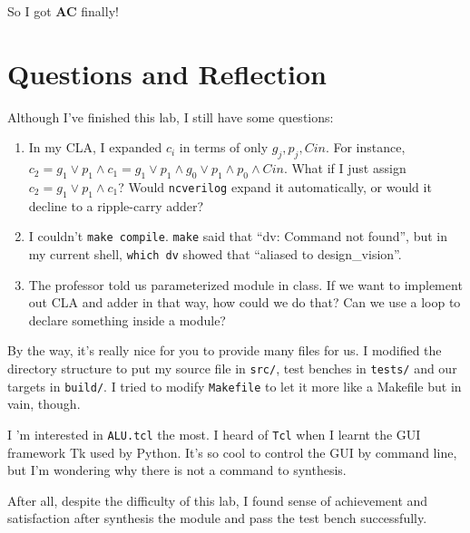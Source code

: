 \documentclass[12pt, a4paper]{article}
\begin{document}
So I got \textbf{AC} finally!

\section{Questions and Reflection}

Although I've finished this lab, I still have some questions:

\begin{enumerate}
\item In my \textsf{CLA}, I expanded $c_i$ in terms of only $g_j,p_j,Cin$. For instance, $c_2=g_1\lor p_1\land c_1=g_1\lor p_1\land g_0\lor p_1\land p_0\land Cin$. What if I just assign $c_2=g_1\lor p_1\land c_1$? Would \texttt{ncverilog} expand it automatically, or would it decline to a ripple-carry adder?
\item I couldn't \texttt{make compile}. \texttt{make} said that ``dv: Command not found'', but in my current shell, \texttt{which dv} showed that ``aliased to design\_vision''.
\item The professor told us parameterized module in class. If we want to implement out \textsf{CLA} and \textsf{adder} in that way, how could we do that? Can we use a loop to declare something inside a module?
\end{enumerate}

By the way, it's really nice for you to provide many files for us. I modified the directory structure to put my source file in \texttt{src/}, test benches in \texttt{tests/} and our targets in \texttt{build/}. I tried to modify \texttt{Makefile} to let it more like a Makefile but in vain, though.

I 'm interested in \texttt{ALU.tcl} the most. I heard of \texttt{Tcl} when I learnt the GUI framework Tk used by Python. It's so cool to control the GUI by command line, but I'm wondering why there is not a command to synthesis.

After all, despite the difficulty of this lab, I found sense of achievement and satisfaction after synthesis the module and pass the test bench successfully.
\end{document}
